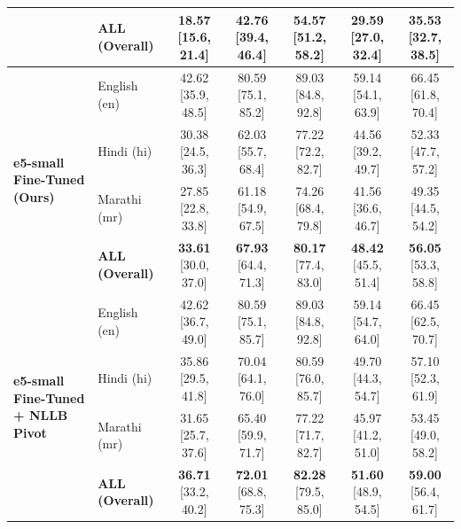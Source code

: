 \documentclass[conference]{IEEEtran}
\begin{document}
\begin{table}[t]
\begin{center}
\begin{tabular}{l l c c c c c}
& \textbf{ALL (Overall)} & \textbf{18.57} [15.6, 21.4] & \textbf{42.76} [39.4, 46.4] & \textbf{54.57} [51.2, 58.2] & \textbf{29.59} [27.0, 32.4] & \textbf{35.53} [32.7, 38.5] \\
\midrule
\multirow{4}{*}{\textbf{e5-small Fine-Tuned (Ours)}} 
& English (en) & 42.62 [35.9, 48.5] & 80.59 [75.1, 85.2] & 89.03 [84.8, 92.8] & 59.14 [54.1, 63.9] & 66.45 [61.8, 70.4] \\
& Hindi (hi) & 30.38 [24.5, 36.3] & 62.03 [55.7, 68.4] & 77.22 [72.2, 82.7] & 44.56 [39.2, 49.7] & 52.33 [47.7, 57.2] \\
& Marathi (mr) & 27.85 [22.8, 33.8] & 61.18 [54.9, 67.5] & 74.26 [68.4, 79.8] & 41.56 [36.6, 46.7] & 49.35 [44.5, 54.2] \\
& \textbf{ALL (Overall)} & \textbf{33.61} [30.0, 37.0] & \textbf{67.93} [64.4, 71.3] & \textbf{80.17} [77.4, 83.0] & \textbf{48.42} [45.5, 51.4] & \textbf{56.05} [53.3, 58.8] \\
\midrule
\multirow{4}{*}{\textbf{e5-small Fine-Tuned + NLLB Pivot}} 
& English (en) & 42.62 [36.7, 49.0] & 80.59 [75.1, 85.7] & 89.03 [84.8, 92.8] & 59.14 [54.7, 64.0] & 66.45 [62.5, 70.7] \\
& Hindi (hi) & 35.86 [29.5, 41.8] & 70.04 [64.1, 76.0] & 80.59 [76.0, 85.7] & 49.70 [44.3, 54.7] & 57.10 [52.3, 61.9] \\
& Marathi (mr) & 31.65 [25.7, 37.6] & 65.40 [59.9, 71.7] & 77.22 [71.7, 82.7] & 45.97 [41.2, 51.0] & 53.45 [49.0, 58.2] \\
& \textbf{ALL (Overall)} & \textbf{36.71} [33.2, 40.2] & \textbf{72.01} [68.8, 75.3] & \textbf{82.28} [79.5, 85.0] & \textbf{51.60} [48.9, 54.5] & \textbf{59.00} [56.4, 61.7] \\
\bottomrule
\end{tabular}
\end{center}
\end{table}
\end{document}
